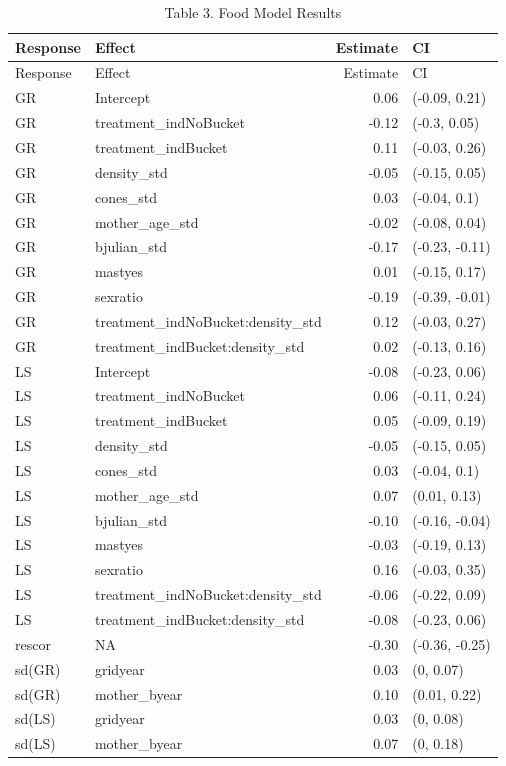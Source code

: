 \documentclass[
]{article}
\begin{document}
\begin{longtable}[]{@{}llrl@{}}
\caption{Table 3. Food Model Results}\tabularnewline
\toprule\noalign{}
Response & Effect & Estimate & CI \\
\midrule\noalign{}
\endfirsthead
\toprule\noalign{}
Response & Effect & Estimate & CI \\
\midrule\noalign{}
\endhead
\bottomrule\noalign{}
\endlastfoot
GR & Intercept & 0.06 & (-0.09, 0.21) \\
GR & treatment\_indNoBucket & -0.12 & (-0.3, 0.05) \\
GR & treatment\_indBucket & 0.11 & (-0.03, 0.26) \\
GR & density\_std & -0.05 & (-0.15, 0.05) \\
GR & cones\_std & 0.03 & (-0.04, 0.1) \\
GR & mother\_age\_std & -0.02 & (-0.08, 0.04) \\
GR & bjulian\_std & -0.17 & (-0.23, -0.11) \\
GR & mastyes & 0.01 & (-0.15, 0.17) \\
GR & sexratio & -0.19 & (-0.39, -0.01) \\
GR & treatment\_indNoBucket:density\_std & 0.12 & (-0.03, 0.27) \\
GR & treatment\_indBucket:density\_std & 0.02 & (-0.13, 0.16) \\
LS & Intercept & -0.08 & (-0.23, 0.06) \\
LS & treatment\_indNoBucket & 0.06 & (-0.11, 0.24) \\
LS & treatment\_indBucket & 0.05 & (-0.09, 0.19) \\
LS & density\_std & -0.05 & (-0.15, 0.05) \\
LS & cones\_std & 0.03 & (-0.04, 0.1) \\
LS & mother\_age\_std & 0.07 & (0.01, 0.13) \\
LS & bjulian\_std & -0.10 & (-0.16, -0.04) \\
LS & mastyes & -0.03 & (-0.19, 0.13) \\
LS & sexratio & 0.16 & (-0.03, 0.35) \\
LS & treatment\_indNoBucket:density\_std & -0.06 & (-0.22, 0.09) \\
LS & treatment\_indBucket:density\_std & -0.08 & (-0.23, 0.06) \\
rescor & NA & -0.30 & (-0.36, -0.25) \\
sd(GR) & gridyear & 0.03 & (0, 0.07) \\
sd(GR) & mother\_byear & 0.10 & (0.01, 0.22) \\
sd(LS) & gridyear & 0.03 & (0, 0.08) \\
sd(LS) & mother\_byear & 0.07 & (0, 0.18) \\
\end{longtable}
\end{document}
